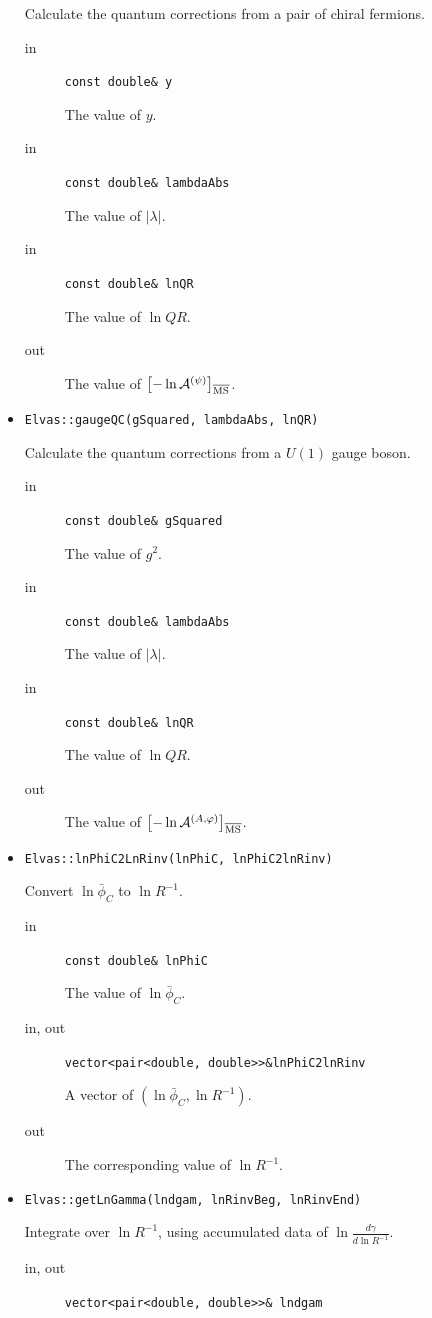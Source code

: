 \documentclass[12pt]{article}
\begin{document}
\begin{itemize}
Calculate the quantum corrections from a pair of chiral fermions.
\begin{description}
 \item[in] \verb|const double& y| 

The value of $y$.
 \item[in] \verb|const double& lambdaAbs| 

The value of $|\lambda |$.
 \item[in] \verb|const double& lnQR| 

The value of $\ln Q R$.
 \item[out] The value of $\left[-\ln\mathcal A^{(\psi)}\right]_{\rm \overline{MS}}$.
\end{description}
 \item \verb|Elvas::gaugeQC(gSquared, lambdaAbs, lnQR)|

Calculate the quantum corrections from a $U(1)$ gauge boson.
\begin{description}
 \item[in] \verb|const double& gSquared| 

The value of $g^2$.
 \item[in] \verb|const double& lambdaAbs| 

The value of $|\lambda |$.
 \item[in] \verb|const double& lnQR| 

The value of $\ln Q R$.
 \item[out] The value of $\left[-\ln\mathcal A^{(A,\varphi)}\right]_{\rm \overline{MS}}$.
\end{description}
 \item \verb|Elvas::lnPhiC2LnRinv(lnPhiC, lnPhiC2lnRinv)|

Convert $\ln\bar\phi_C$ to $\ln R^{-1}$.
\begin{description}
 \item[in] \verb|const double& lnPhiC| 

The value of $\ln\bar\phi_C$.
 \item[in, out] \verb|vector<pair<double, double>>&lnPhiC2lnRinv| 

A vector of $(\ln\bar\phi_C,\ln R^{-1})$.
 \item[out] 

The corresponding value of $\ln R^{-1}$.
\end{description}
 \item \verb|Elvas::getLnGamma(lndgam, lnRinvBeg, lnRinvEnd)|

Integrate over $\ln R^{-1}$, using accumulated data of $\ln\frac{d\gamma}{d\ln R^{-1}}$.
\begin{description}
 \item[in, out] \verb|vector<pair<double, double>>& lndgam| 


\end{description}
\end{itemize}
\end{document}
